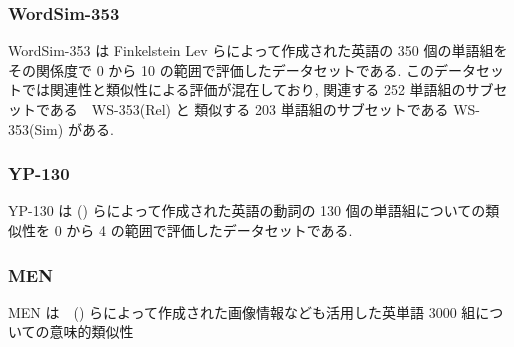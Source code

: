 \documentclass[twocolumn]{jarticle}     %
\begin{document}
\subsubsection{WordSim-353}
WordSim-353\cite{wordsim353} は Finkelstein Lev らによって作成された英語の 350 個の単語組をその関係度で 0 から 10 の範囲で評価したデータセットである.
このデータセットでは関連性と類似性による評価が混在しており, 関連する 252 単語組のサブセットである　WS-353(Rel) と 類似する 203 単語組のサブセットである WS-353(Sim) がある.

\subsubsection{YP-130}
YP-130 は () らによって作成された英語の動詞の 130 個の単語組についての類似性を 0 から 4 の範囲で評価したデータセットである. 

\subsubsection{MEN}
MEN は　() らによって作成された画像情報なども活用した英単語 3000 組についての意味的類似性






\end{document}
